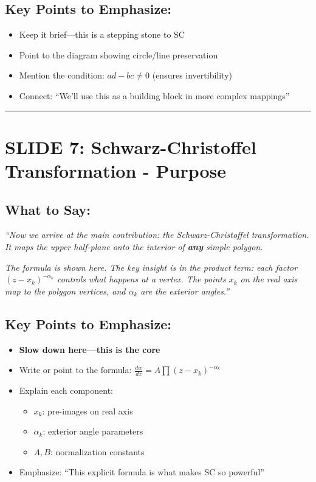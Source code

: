 \documentclass[12pt,a4paper]{article}
\begin{document}
\subsection*{Key Points to Emphasize:}
\begin{itemize}[leftmargin=*]
    \item Keep it brief---this is a stepping stone to SC
    \item Point to the diagram showing circle/line preservation
    \item Mention the condition: $ad - bc \neq 0$ (ensures invertibility)
    \item Connect: ``We'll use this as a building block in more complex mappings''
\end{itemize}

\vspace{10pt}
\hrule
\vspace{10pt}

\section*{SLIDE 7: Schwarz-Christoffel Transformation - Purpose}

\subsection*{What to Say:}
\begin{quotebox}
\textit{``Now we arrive at the main contribution: the Schwarz-Christoffel transformation. It maps the upper half-plane onto the interior of \textbf{any} simple polygon.}

\textit{The formula is shown here. The key insight is in the product term: each factor $(z - x_k)^{-\alpha_k}$ controls what happens at a vertex. The points $x_k$ on the real axis map to the polygon vertices, and $\alpha_k$ are the exterior angles.''}
\end{quotebox}

\subsection*{Key Points to Emphasize:}
\begin{itemize}[leftmargin=*]
    \item \textbf{Slow down here---this is the core}
    \item Write or point to the formula: $\frac{dw}{dz} = A \prod (z - x_k)^{-\alpha_k}$
    \item Explain each component:
    \begin{itemize}
        \item $x_k$: pre-images on real axis
        \item $\alpha_k$: exterior angle parameters
        \item $A, B$: normalization constants
    \end{itemize}
    \item Emphasize: ``This explicit formula is what makes SC so powerful''
\end{itemize}
\end{document}

